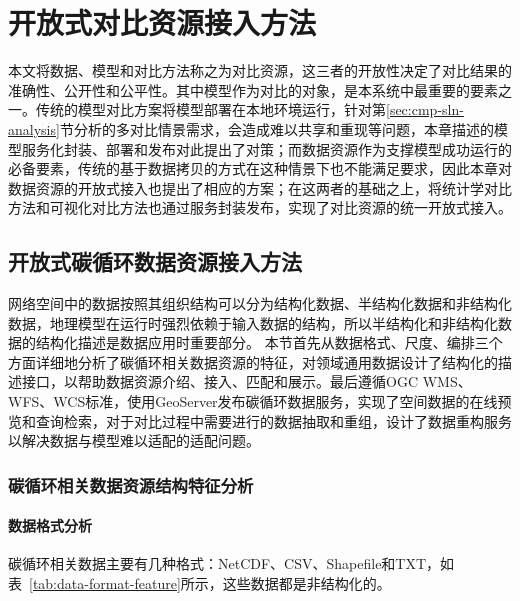 \chapter{开放式对比资源接入方法}
本文将数据、模型和对比方法称之为对比资源，这三者的开放性决定了对比结果的准确性、公开性和公平性。其中模型作为对比的对象，是本系统中最重要的要素之一。传统的模型对比方案将模型部署在本地环境运行，针对第\ref{sec:cmp-sln-analysis}节分析的多对比情景需求，会造成难以共享和重现等问题，本章描述的模型服务化封装、部署和发布对此提出了对策；而数据资源作为支撑模型成功运行的必备要素，传统的基于数据拷贝的方式在这种情景下也不能满足要求，因此本章对数据资源的开放式接入也提出了相应的方案；在这两者的基础之上，将统计学对比方法和可视化对比方法也通过服务封装发布，实现了对比资源的统一开放式接入。

\section{开放式碳循环数据资源接入方法}
\label{sec:data-joinup}
网络空间中的数据按照其组织结构可以分为结构化数据、半结构化数据和非结构化数据，地理模型在运行时强烈依赖于输入数据的结构，所以半结构化和非结构化数据的结构化描述是数据应用时重要部分。
本节首先从数据格式、尺度、编排三个方面详细地分析了碳循环相关数据资源的特征，对领域通用数据设计了结构化的描述接口，以帮助数据资源介绍、接入、匹配和展示。最后遵循OGC WMS、WFS、WCS标准，使用GeoServer发布碳循环数据服务，实现了空间数据的在线预览和查询检索，对于对比过程中需要进行的数据抽取和重组，设计了数据重构服务以解决数据与模型难以适配的适配问题。

\subsection{碳循环相关数据资源结构特征分析}
\subsubsection{数据格式分析}
碳循环相关数据主要有几种格式：NetCDF、CSV、Shapefile和TXT，如表~\ref{tab:data-format-feature}所示，这些数据都是非结构化的。

